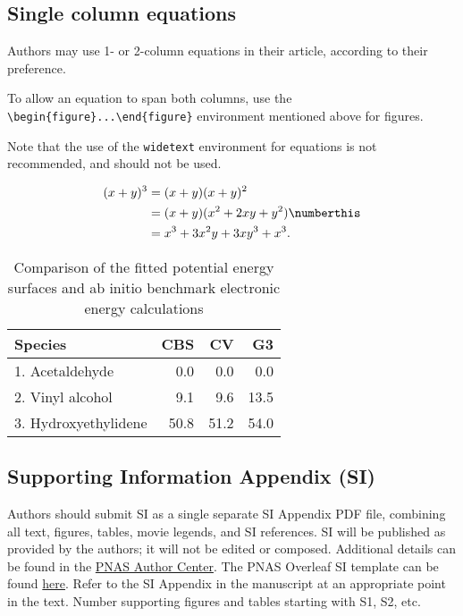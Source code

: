 \documentclass[9pt,twocolumn,twoside,lineno]{pnas-new}
\begin{document}
\subsection*{Single column equations}

Authors may use 1- or 2-column equations in their article, according to their preference.

To allow an equation to span both columns, use the \verb|\begin{figure*}...\end{figure*}| environment mentioned above for figures.

Note that the use of the \verb|widetext| environment for equations is not recommended, and should not be used. 

\begin{figure*}[bt!]
\begin{align*}
(x+y)^3&=(x+y)(x+y)^2\\
       &=(x+y)(x^2+2xy+y^2) \numberthis \label{eqn:example} \\
       &=x^3+3x^2y+3xy^3+x^3. 
\end{align*}
\end{figure*}


\begin{table}%
\centering
\caption{Comparison of the fitted potential energy surfaces and ab initio benchmark electronic energy calculations}
\begin{tabular}{lrrr}
Species & CBS & CV & G3 \\
\midrule
1. Acetaldehyde & 0.0 & 0.0 & 0.0 \\
2. Vinyl alcohol & 9.1 & 9.6 & 13.5 \\
3. Hydroxyethylidene & 50.8 & 51.2 & 54.0\\
\bottomrule
\end{tabular}

\end{table}

\subsection*{Supporting Information Appendix (SI)}

Authors should submit SI as a single separate SI Appendix PDF file, combining all text, figures, tables, movie legends, and SI references. SI will be published as provided by the authors; it will not be edited or composed. Additional details can be found in the \href{https://www.pnas.org/authors/submitting-your-manuscript#manuscript-formatting-guidelines}{PNAS Author Center}. The PNAS Overleaf SI template can be found \href{https://www.overleaf.com/latex/templates/pnas-template-for-supplementary-information/wqfsfqwyjtsd}{here}. Refer to the SI Appendix in the manuscript at an appropriate point in the text. Number supporting figures and tables starting with S1, S2, etc.
\end{document}
